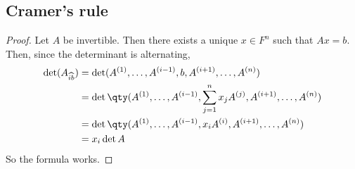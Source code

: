 \subsection{Cramer's rule}
\begin{proof}
	Let $A$ be invertible.
	Then there exists a unique $x \in F^n$ such that $Ax = b$.
	Then, since the determinant is alternating,
	\begin{align*}
		\det (A_{\widehat{ib}}) & = \det(A^{(1)}, \dots, A^{(i-1)}, b, A^{(i+1)}, \dots, A^{(n)})                            \\
		                        & = \det\qty(A^{(1)}, \dots, A^{(i-1)}, \sum_{j=1}^n x_j A^{(j)}, A^{(i+1)}, \dots, A^{(n)}) \\
		                        & = \det\qty(A^{(1)}, \dots, A^{(i-1)}, x_i A^{(i)}, A^{(i+1)}, \dots, A^{(n)})              \\
		                        & = x_i \det A
	\end{align*}
	So the formula works.
\end{proof}